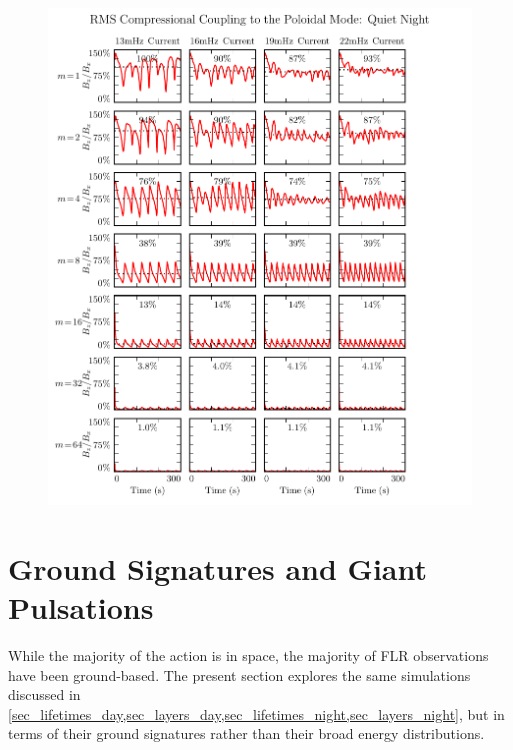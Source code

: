 \begin{figure}[!htb]
    \centering
    \includegraphics[width=\textwidth]{figures/comp_4.pdf}
    \caption[Compressional Coupling to the Poloidal Mode: Quiet Night]{
    }
    \label{fig_comp_4}
\end{figure}

\section{Ground Signatures and Giant Pulsations}
  \label{sec_ground}

While the majority of the action is in space, the majority of FLR observations have been ground-based. The present section explores the same simulations discussed in \cref{sec_lifetimes_day,sec_layers_day,sec_lifetimes_night,sec_layers_night}, but in terms of their ground signatures rather than their broad energy distributions. 

